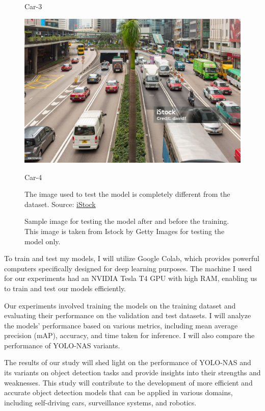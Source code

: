 \begin{figure}[H]
\begin{minipage}{0.5\textwidth}
    \caption{Car-3}
    \label{}
  \end{minipage}
    \begin{minipage}{0.5\textwidth}
    \centering
    \includegraphics[width=\linewidth]{tex/img/car-11.jpg}
    \caption{Car-4}
    \label{}
  \end{minipage}
  \caption{Sample image for testing the model after and before the training. This image is taken from Istock by Getty Images for testing the model only.} 
\vspace{3mm}
  The image used to test the model is completely different from the dataset. Source: \href{https://www.istockphoto.com/pl/zdj%C4%99cie/wiele-samochod%C3%B3w-na-drodze-gm490081958-75026541}{iStock}
\end{figure}  
To train and test my models, I will utilize Google Colab, which provides powerful computers specifically designed for deep learning purposes. The machine I used for our experiments had an NVIDIA Tesla T4 GPU with high RAM, enabling us to train and test our models efficiently. 

Our experiments involved training the models on the training dataset and evaluating their performance on the validation and test datasets. I will analyze the models' performance based on various metrics, including mean average precision (mAP), accuracy, and time taken for inference. I will also compare the performance of YOLO-NAS variants.

The results of our study will shed light on the performance of YOLO-NAS and its variants on object detection tasks and provide insights into their strengths and weaknesses. This study will contribute to the development of more efficient and accurate object detection models that can be applied in various domains, including self-driving cars, surveillance systems, and robotics.
